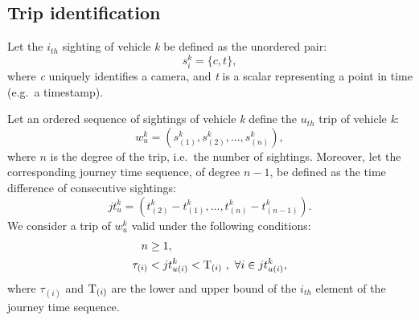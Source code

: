 \subsection{Trip identification}\label{s.trips}

Let the $i_{th}$ sighting of vehicle \emph{k} be defined as the unordered pair:
\begin{equation} \label{e.sighting}
s^{k}_{i} = \{ c, t \},
\end{equation}
where \emph{c} uniquely identifies a camera, and \emph{t} is a scalar representing a point in time (e.g.\ a timestamp).

Let an ordered sequence of sightings of vehicle \emph{k} define the $u_{th}$ trip of vehicle \emph{k}:
\begin{equation} \label{e.trip}
w^{k}_{u} = \left(s^{k}_{(1)}, s^{k}_{(2)}, \dots , s^{k}_{(n)}\right),
\end{equation}
where \( n \) is the degree of the trip, i.e.\ the number of sightings. Moreover, let the corresponding journey time sequence, of degree \(n-1\), be defined as the time difference of consecutive sightings:
\begin{equation} \label{e.journeytime}
jt^{k}_{u} = \left(t^{k}_{(2)} - t^{k}_{(1)}, \ldots, t^{k}_{(n)} - t^{k}_{(n-1)} \right).
\end{equation}
We consider a trip of \emph{$w^k_u$} valid under the following conditions:
\begin{align}
n &\ge 1 , \label{e.trip.constraints.1} \\
\tau_{(i)} &< jt^{k}_{u(i)} < \mathrm{T}_{(i)} \ , \ \forall i \in jt^{k}_{u(i)} \label{e.trip.constraints.2},
\end{align}
where $\tau_{(i)}$ and $\mathrm{T}_{(i)}$ are the lower and upper bound of the $i_{th}$ element of the journey time sequence.

